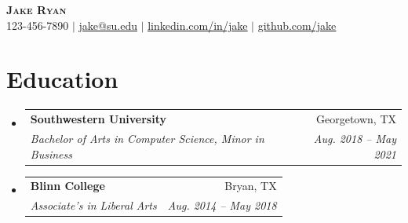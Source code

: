 \documentclass[letterpaper,11pt]{article}
\makeatletter
\newcommand{\resumeSubheading}[4]{
  \vspace{-2pt}\item
    \begin{tabular*}{0.97\textwidth}[t]{l@{\extracolsep{\fill}}r}
      \textbf{#1} & #2 \\
      \textit{\small#3} & \textit{\small #4} \\
    \end{tabular*}\vspace{-7pt}
}
\newcommand{\resumeSubHeadingListStart}{\begin{itemize}[leftmargin=0.15in, label={}]}
\newcommand{\resumeSubHeadingListEnd}{\end{itemize}}
\makeatother
\begin{document}
\begin{center}
    \textbf{\Huge \scshape Jake Ryan} \\ \vspace{1pt}
    \small 123-456-7890 $|$ \href{mailto:x@x.com}{\underline{jake@su.edu}} $|$
    \href{https://linkedin.com/in/...}{\underline{linkedin.com/in/jake}} $|$
    \href{https://github.com/...}{\underline{github.com/jake}}
\end{center}
\section{Education}
\resumeSubHeadingListStart
\resumeSubheading
  {Southwestern University}{Georgetown, TX}
  {Bachelor of Arts in Computer Science, Minor in Business}{Aug. 2018 -- May 2021}
\resumeSubheading
  {Blinn College}{Bryan, TX}
  {Associate's in Liberal Arts}{Aug. 2014 -- May 2018}
\resumeSubHeadingListEnd
\end{document}
